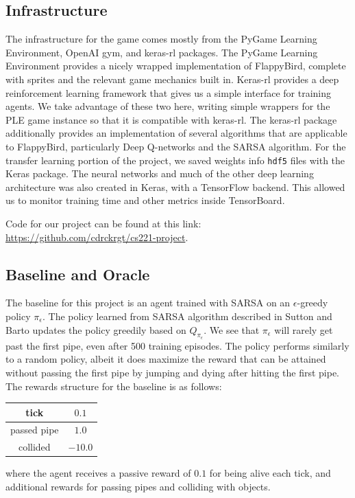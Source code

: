 \documentclass{article}
\begin{document}
\subsection{Infrastructure}

The infrastructure for the game comes mostly from the PyGame Learning Environment, OpenAI gym, and keras-rl packages. 
The PyGame Learning Environment provides a nicely wrapped implementation of FlappyBird, complete with sprites and the relevant game mechanics built in. \cite{ple} \cite{openaigym} \cite{ale}
Keras-rl provides a deep reinforcement learning framework that gives us a simple interface for training agents. 
We take advantage of these two here, writing simple wrappers for the PLE game instance so that it is compatible with keras-rl. \cite{kerasrl}
The keras-rl package additionally provides an implementation of several algorithms that are applicable to FlappyBird, particularly Deep Q-networks and the SARSA algorithm.
For the transfer learning portion of the project, we saved weights info \texttt{hdf5} files with the Keras package.
The neural networks and much of the other deep learning architecture was also created in Keras, with a TensorFlow backend. \cite{keras} \cite{tensorflow}
This allowed us to monitor training time and other metrics inside TensorBoard.

Code for our project can be found at this link: \href{https://github.com/cdrckrgt/cs221-project} {https://github.com/cdrckrgt/cs221-project}.

\subsection{Baseline and Oracle}
The baseline for this project is an agent trained with SARSA on an $\epsilon$-greedy policy $\pi_{\epsilon}$.
The policy learned from SARSA algorithm described in Sutton and Barto updates the policy greedily based on $Q_{\pi_{\epsilon}}$. \cite{rl}
We see that $\pi_{\epsilon}$ will rarely get past the first pipe, even after 500 training episodes.
The policy performs similarly to a random policy, albeit it does maximize the reward that can be attained without passing the first pipe by jumping and dying after hitting the first pipe.
The rewards structure for the baseline is as follows:
\begin{center}
\begin{tabular} { | c | c | }
    \hline
    tick & $0.1$ \\
    \hline
    passed pipe & $1.0$ \\
    \hline
    collided & $-10.0$ \\
    \hline
\end{tabular}
\end{center}
where the agent receives a passive reward of $0.1$ for being alive each tick, and additional rewards for passing pipes and colliding with objects.
\end{document}

